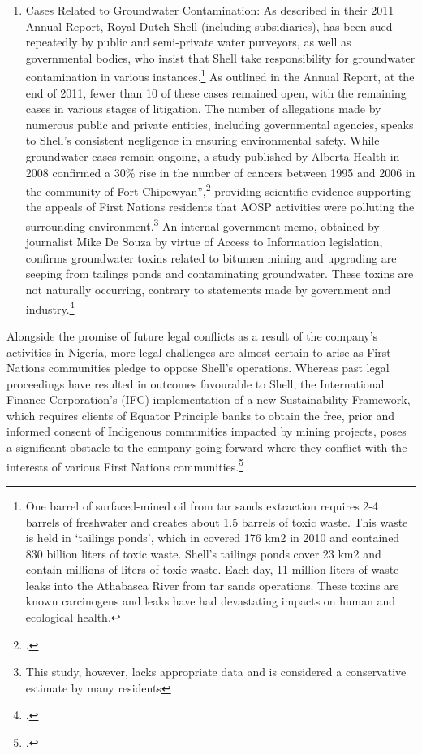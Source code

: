 \begin{enumerate}
	\item Cases Related to Groundwater Contamination: As described in their 2011 Annual Report, Royal Dutch Shell (including subsidiaries), has been sued repeatedly by public and semi-private water purveyors, as well as governmental bodies, who insist that Shell take responsibility for groundwater contamination in various instances.\footnote{One barrel of surfaced-mined oil from tar sands extraction requires 2-4 barrels of freshwater and creates about 1.5 barrels of toxic waste. This waste is held in ‘tailings ponds’, which in covered 176 km2 in 2010 and contained 830 billion liters of toxic waste. Shell’s tailings ponds cover 23 km2 and contain millions of liters of toxic waste. Each day, 11 million liters of waste leaks into the Athabasca River from tar sands operations. These toxins are known carcinogens and leaks have had devastating impacts on human and ecological health.}  As outlined in the Annual Report, at the end of 2011, fewer than 10 of these cases remained open, with the remaining cases in various stages of litigation. The number of allegations made by numerous public and private entities, including governmental agencies, speaks to Shell’s consistent negligence in ensuring environmental safety. While groundwater cases remain ongoing, a study published by Alberta Health in 2008 confirmed a 30\% rise in the number of cancers between 1995 and 2006 in the community of Fort Chipewyan”,\footcite[][]{RiskingRuin_2012}  providing scientific evidence supporting the appeals of First Nations residents that AOSP activities were polluting the surrounding environment.\footnote{  This study, however, lacks appropriate data and is considered a conservative estimate by many residents}  An internal government memo, obtained by journalist Mike De Souza by virtue of Access to Information legislation, confirms groundwater toxins related to bitumen mining and upgrading are seeping from tailings ponds and contaminating groundwater. These toxins are not naturally occurring, contrary to statements made by government and industry.\footcite[][]{Memorandum_2012} 
\end{enumerate}
Alongside the promise of future legal conflicts as a result of the company’s activities in Nigeria, more legal challenges are almost certain to arise as First Nations communities pledge to oppose Shell’s operations. Whereas past legal proceedings have resulted in outcomes favourable to Shell, the International Finance Corporation’s (IFC) implementation of a new Sustainability Framework, which requires clients of Equator Principle banks to obtain the free, prior and informed consent of Indigenous communities impacted by mining projects, poses a significant obstacle to the company going forward where they conflict with the interests of various First Nations communities.\footcite[][]{Sosa_2011}



